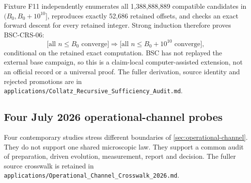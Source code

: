 \documentclass[11pt,a4paper]{article}
\theoremstyle{definition}
\theoremstyle{plain}
\theoremstyle{remark}
\begin{document}
Fixture F11 independently enumerates all 1,388,888,889 compatible candidates
in \((B_0,B_0+10^{10}]\), reproduces exactly 52,686 retained offsets, and
checks an exact forward descent for every retained integer.  Strong induction
therefore proves BSC-CRS-06:
\[
 \bigl[\text{all }n\le B_0\text{ converge}\bigr]
 \Longrightarrow
 \bigl[\text{all }n\le B_0+10^{10}\text{ converge}\bigr],
\]
conditional on the retained exact computation.  BSC has not replayed the
external base campaign, so this is a claim-local computer-assisted extension,
not an official record or a universal proof.  The fuller derivation, source
identity and rejected promotions are in
\texttt{applications/Collatz\_Recursive\_Sufficiency\_Audit.md}.

\subsection{Four July 2026 operational-channel probes}
\label{sec:channel-probes}

Four contemporary studies stress different boundaries of
\cref{sec:operational-channel}.  They do not support one shared microscopic
law.  They support a common audit of preparation, driven evolution,
measurement, report and decision.  The fuller source crosswalk is retained in
\texttt{applications/Operational\_Channel\_Crosswalk\_2026.md}.
\end{document}
